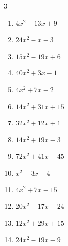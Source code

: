 \begin{multicols}{3}
\begin{enumerate}
        \phantom{$=(4x+1)(2x-9)$}

  \item $4x^{2}-13x+9$

        \phantom{$=(x-1)(4x-9)$}

  \item $24x^{2}-x-3$

        \phantom{$=(3x+1)(8x-3)$}

  \item $15x^{2}-19x+6$

        \phantom{$=(3x-2)(5x-3)$}

  \item $40x^{2}+3x-1$

        \phantom{$=(8x-1)(5x+1)$}

\columnbreak %

  \item $4x^{2}+7x-2$

        \phantom{$=(4x-1)(x+2)$}

  \item $14x^{2}+31x+15$

        \phantom{$=(7x+5)(2x+3)$}

  \item $32x^{2}+12x+1$

        \phantom{$=(4x+1)(8x+1)$}

  \item $14x^{2}+19x-3$

        \phantom{$=(7x-1)(2x+3)$}

  \item $72x^{2}+41x-45$

        \phantom{$=(9x-5)(8x+9)$}

  \item $x^{2}-3x-4$

        \phantom{$=(x+1)(x-4)$}

  \item $4x^{2}+7x-15$

        \phantom{$=(x+3)(4x-5)$}

  \item $20x^{2}-17x-24$

        \phantom{$=(5x-8)(4x+3)$}

  \item $12x^{2}+29x+15$

        \phantom{$=(3x+5)(4x+3)$}

  \item $24x^{2}-19x-9$

        \phantom{$=(3x+1)(8x-9)$}


\end{enumerate}
\end{multicols}
